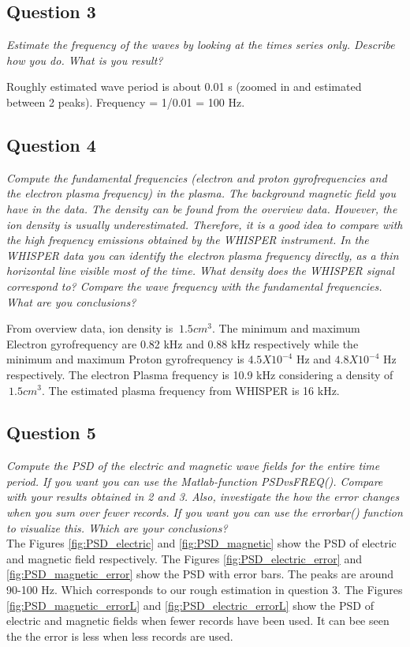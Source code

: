 \documentclass{article}
\begin{document}
\subsection{Question 3}
\textit{Estimate the frequency of the waves by looking at the times series only. Describe how you do. What is you result?}

Roughly estimated wave period is about 0.01 s (zoomed in and estimated between 2 peaks). Frequency = 1/0.01 = 100 Hz.

\subsection{Question 4}
\textit{Compute the fundamental frequencies (electron and proton gyrofrequencies and the electron plasma frequency) in the plasma. The background magnetic field you have in the data. The density can be found from the overview data. However, the ion density is usually underestimated. Therefore, it is a good idea to compare with the high frequency emissions obtained by the WHISPER instrument. In the WHISPER data you can identify the electron plasma frequency directly, as a thin horizontal line visible most of the time. What density does the WHISPER signal correspond to? Compare the wave frequency with the fundamental frequencies. What are you conclusions?}

From overview data, ion density is $~1.5 cm^3$. The minimum and maximum Electron gyrofrequency are 0.82 kHz and 0.88 kHz respectively while the minimum and maximum Proton gyrofrequency is $4.5 X 10^{-4}$ Hz and $4.8 X 10^{-4}$ Hz respectively. The electron Plasma frequency is 10.9 kHz considering a density of $~1.5 cm^3$. The estimated plasma frequency from WHISPER is 16 kHz.


\subsection{Question 5}
\textit{Compute the PSD of the electric and magnetic wave fields for the entire time period. If you want you can use the Matlab-function PSDvsFREQ(). Compare with your results obtained in 2 and 3. Also, investigate the how the error changes when you sum over fewer records. If you want you can use the errorbar() function to visualize this. Which are your
conclusions?}\\

The Figures \ref{fig:PSD_electric} and \ref{fig:PSD_magnetic} show the PSD of electric and magnetic field respectively. The Figures \ref{fig:PSD_electric_error} and \ref{fig:PSD_magnetic_error} show the PSD with error bars. The peaks are around 90-100 Hz. Which corresponds to our rough estimation in question 3. The Figures \ref{fig:PSD_magnetic_errorL} and \ref{fig:PSD_electric_errorL} show the PSD of electric and magnetic fields when fewer records have been used. It can bee seen the the error is less when less records are used. 
\end{document}
